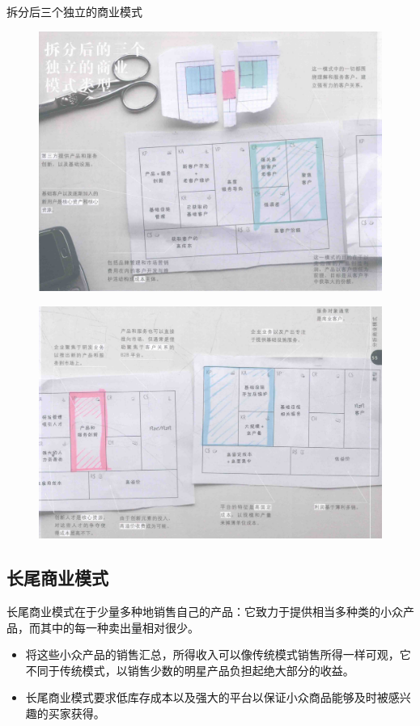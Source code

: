     拆分后三个独立的商业模式
    \begin{figure}[H]
		\centering
        \vspace{-0.5em}
		\includegraphics[width=\textwidth]{img/拆分后三个独立的商业模式1.png}
        \vspace{-0.5em}
	\end{figure}

    \begin{figure}[H]
		\centering
        \vspace{-0.5em}
		\includegraphics[width=\textwidth]{img/拆分后三个独立的商业模式2.png}
        \vspace{-0.5em}
	\end{figure}

    \subsection{长尾商业模式}
    长尾商业模式在于少量多种地销售自己的产品：它致力于提供相当多种类的小众产品，而其中的每一种卖出量相对很少。
    \begin{itemize}
        \item 将这些小众产品的销售汇总，所得收入可以像传统模式销售所得一样可观，它不同于传统模式，以销售少数的明星产品负担起绝大部分的收益。
        \item 长尾商业模式要求低库存成本以及强大的平台以保证小众商品能够及时被感兴趣的买家获得。
    \end{itemize}


